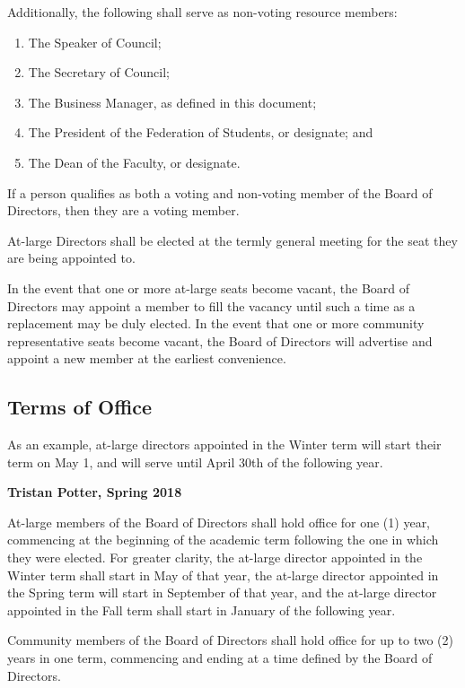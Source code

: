 \noindent Additionally, the following shall serve as non-voting resource
members:
\begin{enumerate}
  \item The Speaker of Council;
  \item The Secretary of Council;
  \item The Business Manager, as defined in this document;
  \item The President of the Federation of Students, or designate; and
  \item The Dean of the Faculty, or designate.
\end{enumerate}

If a person qualifies as both a voting and non-voting member of the Board of 
Directors, then they are a voting member.

At-large Directors shall be elected at the termly general meeting for the
seat they are being appointed to.

In the event that one or more at-large seats become vacant, the Board of
Directors may appoint a member to fill the vacancy until such a time as a
replacement may be duly elected. In the event that one or more community representative seats become vacant, the Board of Directors will advertise and appoint a new member at the earliest convenience.


\subsection{Terms of Office}
\begin{annotation}
    As an example, at-large directors appointed in the Winter term will start
    their term on May 1, and will serve until April 30th of the following year.

    \textbf{Tristan Potter, Spring 2018}
\end{annotation}
At-large members of the Board of Directors shall hold office for one (1) year,
commencing at the beginning of the academic term following the one in which
they were elected. For greater clarity, the at-large director appointed in
the Winter term shall start in May of that year, the at-large director 
appointed in the Spring term will start in September of that year, and the
at-large director appointed in the Fall term shall start in January of the 
following year. 

Community members of the Board of Directors shall hold office for up to two (2)
years in one term, commencing and ending at a time defined by the Board of
Directors.

